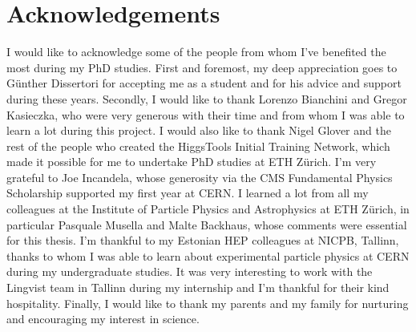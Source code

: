 \chapter*{Acknowledgements}
I would like to acknowledge some of the people from whom I've benefited the most during my PhD studies. First and foremost, my deep appreciation goes to G\"unther Dissertori for accepting me as a student and for his advice and support during these years. Secondly, I would like to thank Lorenzo Bianchini and Gregor Kasieczka, who were very generous with their time and from whom I was able to learn a lot during this project. I would also like to thank Nigel Glover and the rest of the people who created the HiggsTools Initial Training Network, which made it possible for me to undertake PhD studies at ETH Z\"urich. I'm very grateful to Joe Incandela, whose generosity via the CMS Fundamental Physics Scholarship supported my first year at CERN. I learned a lot from all my colleagues at the Institute of Particle Physics and Astrophysics at ETH Z\"urich, in particular Pasquale Musella and Malte Backhaus, whose comments were essential for this thesis. I'm thankful to my Estonian HEP colleagues at NICPB, Tallinn, thanks to whom I was able to learn about experimental particle physics at CERN during my undergraduate studies. It was very interesting to work with the Lingvist team in Tallinn during my internship and I'm thankful for their kind hospitality. Finally, I would like to thank my parents and my family for nurturing and encouraging my interest in science.